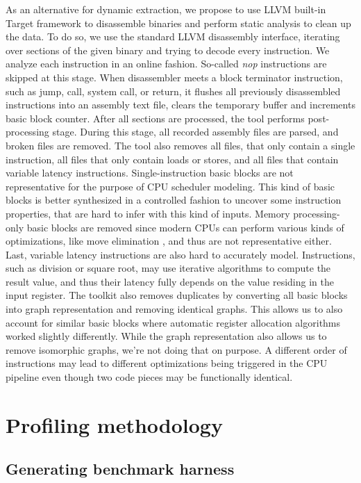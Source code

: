 As an alternative for dynamic extraction, we propose to use LLVM built-in Target framework to 
disassemble binaries and perform static analysis to clean up the data. To do so, we use the standard 
LLVM disassembly interface, iterating over sections of the given binary and trying to decode every 
instruction. We analyze each instruction in an online fashion. So-called \textit{nop} instructions are skipped 
at this stage. When disassembler meets a block terminator instruction, such as jump, call, system 
call, or return, it flushes all previously disassembled instructions into an assembly text file, 
clears the temporary buffer and increments basic block counter. After all sections are processed, 
the tool performs post-processing stage. During this stage, all recorded assembly files are parsed, 
and broken files are removed. The tool also removes all files, that only contain a single instruction, 
all files that only contain loads or stores, and all files that contain variable latency instructions. 
Single-instruction basic blocks are not representative for the purpose of CPU scheduler modeling. 
This kind of basic blocks is better synthesized in a controlled fashion to uncover some instruction 
properties, that are hard to infer with this kind of inputs. Memory processing-only basic blocks are 
removed since modern CPUs can perform various kinds of optimizations, like move 
elimination \cite{Intel64IA322022}, and thus are not representative either. Last, variable latency 
instructions are also hard to accurately model. Instructions, such as division or square root, may 
use iterative algorithms to compute the result value, and thus their latency fully depends on the 
value residing in the input register. The toolkit also removes duplicates by converting all basic 
blocks into graph representation and removing identical graphs. This allows us to also account for 
similar basic blocks where automatic register allocation algorithms worked slightly differently. 
While the graph representation also allows us to remove isomorphic graphs, we're not doing that on purpose. 
A different order of instructions may lead to different optimizations being triggered in the CPU pipeline 
even though two code pieces may be functionally identical.

\section{Profiling methodology}

\subsection{Generating benchmark harness}

